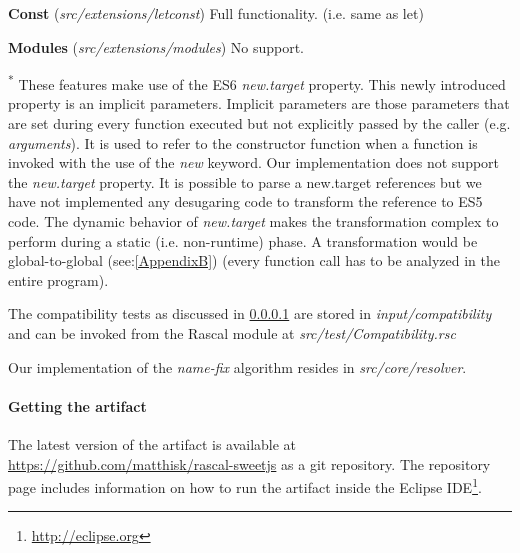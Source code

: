 \textbf{Const} (\textit{src/extensions/letconst}) \newline
Full functionality. (i.e. same as let)

\textbf{Modules} (\textit{src/extensions/modules}) 
No support.

\textsuperscript{*} These features make use of the ES6 \textit{new.target} property. This newly introduced property is an implicit parameters. Implicit parameters are those parameters that are set during every function executed but not explicitly passed by the caller (e.g. \textit{arguments}). It is used to refer to the constructor function when a function is invoked with the use of the \textit{new} keyword.
Our implementation does not support the \textit{new.target} property. It is possible to parse a new.target references but we have not implemented any desugaring code to transform the reference to ES5 code. The dynamic behavior of \textit{new.target} makes the transformation complex to perform during a static (i.e. non-runtime) phase. A transformation would be global-to-global (see:\ref{AppendixB}) (every function call has to be analyzed in the entire program).

The compatibility tests as discussed in \ref{} are stored in \textit{input/compatibility} and can be invoked from the Rascal module at \textit{src/test/Compatibility.rsc}

Our implementation of the \textit{name-fix}\citep{Erdweg2014a} algorithm resides in \textit{src/core/resolver}. 

\paragraph{Getting the artifact}
The latest version of the artifact is available at \url{https://github.com/matthisk/rascal-sweetjs} as a git repository. The repository page includes information on how to run the artifact inside the Eclipse IDE\footnote{\url{http://eclipse.org}}.